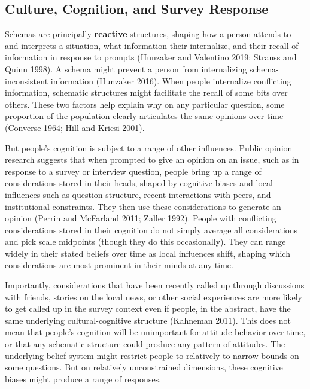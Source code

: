 \documentclass[12pt,]{article}
\begin{document}
\hypertarget{culture-cognition-and-survey-response}{%
\subsection{Culture, Cognition, and Survey Response}\label{culture-cognition-and-survey-response}}

Schemas are principally \textbf{reactive} structures, shaping how a person attends to and interprets a situation, what information their internalize, and their recall of information in response to prompts (Hunzaker and Valentino 2019; Strauss and Quinn 1998). A schema might prevent a person from internalizing schema-inconsistent information (Hunzaker 2016). When people internalize conflicting information, schematic structures might facilitate the recall of some bits over others. These two factors help explain why on any particular question, some proportion of the population clearly articulates the same opinions over time (Converse 1964; Hill and Kriesi 2001).

But people's cognition is subject to a range of other influences. Public opinion research suggests that when prompted to give an opinion on an issue, such as in response to a survey or interview question, people bring up a range of considerations stored in their heads, shaped by cognitive biases and local influences such as question structure, recent interactions with peers, and institutional constraints. They then use these considerations to generate an opinion (Perrin and McFarland 2011; Zaller 1992). People with conflicting considerations stored in their cognition do not simply average all considerations and pick scale midpoints (though they do this occasionally). They can range widely in their stated beliefs over time as local influences shift, shaping which considerations are most prominent in their minds at any time.

Importantly, considerations that have been recently called up through discussions with friends, stories on the local news, or other social experiences are more likely to get called up in the survey context even if people, in the abstract, have the same underlying cultural-cognitive structure (Kahneman 2011). This does not mean that people's cognition will be unimportant for attitude behavior over time, or that any schematic structure could produce any pattern of attitudes. The underlying belief system might restrict people to relatively to narrow bounds on some questions. But on relatively unconstrained dimensions, these cognitive biases might produce a range of responses.
\end{document}

